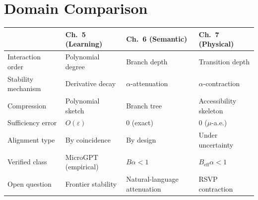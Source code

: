\section{Domain Comparison}

\begin{center}\small
\begin{tabular}{llll}
\toprule
 & Ch.~5 (Learning) & Ch.~6 (Semantic) & Ch.~7 (Physical) \\
\midrule
Interaction order & Polynomial degree & Branch depth & Transition depth \\
Stability mechanism & Derivative decay & $\alpha$-attenuation & $\alpha$-contraction \\
Compression & Polynomial sketch & Branch tree & Accessibility skeleton \\
Sufficiency error & $O(\varepsilon)$ & $0$ (exact) & $0$ ($\mu$-a.e.) \\
Alignment type & By coincidence & By design & Under uncertainty \\
Verified class & MicroGPT (empirical) & $B\alpha < 1$ & $B_{\mathrm{eff}}\alpha < 1$ \\
Open question & Frontier stability & Natural-language attenuation & RSVP contraction \\
\bottomrule
\end{tabular}
\end{center}

